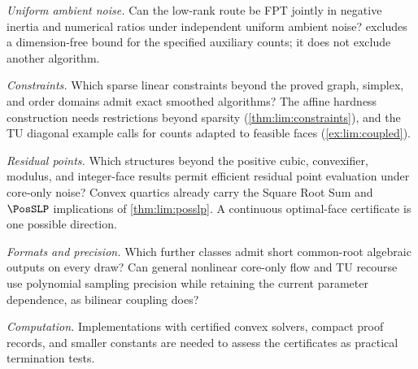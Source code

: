 \emph{Uniform ambient noise.} Can the low-rank route be FPT jointly in
negative inertia and numerical ratios under independent uniform ambient
noise?  excludes a dimension-free bound for the
specified auxiliary counts; it does not exclude another algorithm.

\emph{Constraints.} Which sparse linear constraints beyond the proved graph,
simplex, and order domains admit exact smoothed algorithms? The affine
hardness construction needs restrictions beyond sparsity
(\cref{thm:lim:constraints}), and the TU diagonal example calls for counts
adapted to feasible faces (\cref{ex:lim:coupled}).

\emph{Residual points.} Which structures beyond the positive cubic,
convexifier, modulus, and integer-face results permit efficient residual
point evaluation under core-only noise? Convex quartics already carry the
Square Root Sum and $\PosSLP$ implications of \cref{thm:lim:posslp}.
A continuous optimal-face certificate is one possible direction.

\emph{Formats and precision.} Which further classes admit short common-root
algebraic outputs on every draw? Can general nonlinear core-only flow and TU
recourse use polynomial sampling precision while retaining the current
parameter dependence, as bilinear coupling does?

\emph{Computation.} Implementations with certified convex solvers, compact
proof records, and smaller constants are needed to assess the certificates
as practical termination tests.
